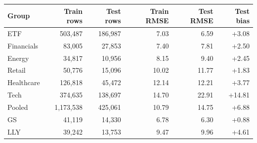 \begin{tabular}{lrrrrr}
\toprule
Group & Train rows & Test rows & Train RMSE & Test RMSE & Test bias \\
\midrule
ETF & 503,487 & 186,987 & 7.03 & 6.59 & +3.08 \\
Financials & 83,005 & 27,853 & 7.40 & 7.81 & +2.50 \\
Energy & 34,817 & 10,956 & 8.15 & 9.40 & +2.45 \\
Retail & 50,776 & 15,096 & 10.02 & 11.77 & +1.83 \\
Healthcare & 126,818 & 45,472 & 12.14 & 12.21 & +3.77 \\
Tech & 374,635 & 138,697 & 14.70 & 22.91 & +14.81 \\
Pooled & 1,173,538 & 425,061 & 10.79 & 14.75 & +6.88 \\
\midrule
GS & 41,119 & 14,330 & 6.78 & 6.30 & +0.88 \\
LLY & 39,242 & 13,753 & 9.47 & 9.96 & +4.61 \\
\bottomrule\end{tabular}
